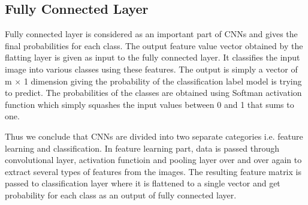 \subsection{Fully Connected Layer} 

Fully connected layer is considered as an important 
part of CNNs and gives the final 
probabilities for each class.  The output feature value vector obtained by the flatting layer is 
given as input to the fully connected layer. It classifies the input image into various classes using these features. The output is simply a vector 
of m $\times$ 1 dimension giving the probability of the 
classification label model is trying to predict. The probabilities of the
classes are obtained using Softman activation function which simply squashes the input values between 0 and 1 that sums to one.

Thus we conclude that CNNs are divided into two separate categories i.e. feature learning and classification. In feature learning part,
 data is passed through convolutional layer, activation functioin and pooling layer over and over again to extract several types
of features from the images. The resulting feature matrix is passed to classification
layer where it is flattened to a single vector and get probability for each class as an output of fully connected layer.